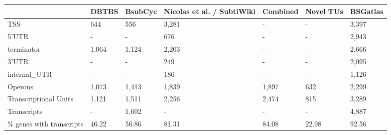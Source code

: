 
\begin{tabular}{lllllll}
\toprule
  & DBTBS & BsubCyc & Nicolas et al. / SubtiWiki & Combined & Novel TUs & BSGatlas\\
\midrule
TSS & 644 & 556 & 3,281 & - & - & 3,397\\
5'UTR & - & - & 676 & - & - & 2,943\\
terminator & 1,064 & 1,124 & 2,203 & - & - & 2,666\\
3'UTR & - & - & 249 & - & - & 2,095\\
internal\_UTR & - & - & 186 & - & - & 1,126\\
\addlinespace
Operons & 1,073 & 1,413 & 1,839 & 1,897 & 632 & 2,299\\
Transcriptional Units & 1,121 & 1,511 & 2,256 & 2,474 & 815 & 3,289\\
Transcripts & - & 1,602 & - & - & - & 4,887\\
\% genes with transcripts & 46.22 & 56.86 & 81.31 & 84.08 & 22.98 & 92.56\\
\bottomrule
\end{tabular}
